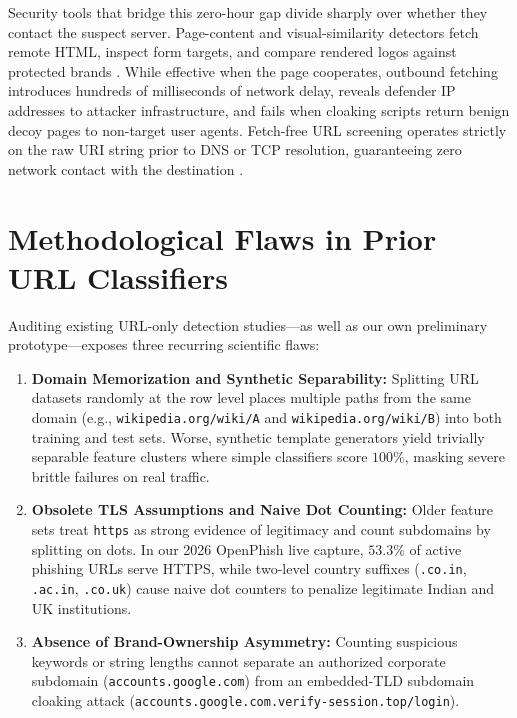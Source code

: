 \documentclass[12pt,a4paper]{report}
\begin{document}
Security tools that bridge this zero-hour gap divide sharply over whether they contact the suspect server. Page-content and visual-similarity detectors fetch remote HTML, inspect form targets, and compare rendered logos against protected brands \cite{xiang2011,abdelnabi2020}. While effective when the page cooperates, outbound fetching introduces hundreds of milliseconds of network delay, reveals defender IP addresses to attacker infrastructure, and fails when cloaking scripts return benign decoy pages to non-target user agents. Fetch-free URL screening operates strictly on the raw URI string prior to DNS or TCP resolution, guaranteeing zero network contact with the destination \cite{ma2009,sahingoz2019}.

\section[Methodological Flaws in Prior URL Classifiers]{Methodological Flaws in Prior URL Classifiers}
Auditing existing URL-only detection studies---as well as our own preliminary prototype---exposes three recurring scientific flaws:
\begin{enumerate}
\item \textbf{Domain Memorization and Synthetic Separability:} Splitting URL datasets randomly at the row level places multiple paths from the same domain (e.g., \texttt{wikipedia.org/wiki/A} and \texttt{wikipedia.org/wiki/B}) into both training and test sets. Worse, synthetic template generators yield trivially separable feature clusters where simple classifiers score $100\%$, masking severe brittle failures on real traffic.
\item \textbf{Obsolete TLS Assumptions and Naive Dot Counting:} Older feature sets treat \texttt{https} as strong evidence of legitimacy and count subdomains by splitting on dots. In our 2026 OpenPhish live capture, $53.3\%$ of active phishing URLs serve HTTPS, while two-level country suffixes (\texttt{.co.in}, \texttt{.ac.in}, \texttt{.co.uk}) cause naive dot counters to penalize legitimate Indian and UK institutions.
\item \textbf{Absence of Brand-Ownership Asymmetry:} Counting suspicious keywords or string lengths cannot separate an authorized corporate subdomain (\texttt{accounts.\allowbreak google.com}) from an embedded-TLD subdomain cloaking attack (\texttt{accounts.\allowbreak google.com.\allowbreak verify-\allowbreak session.top/\allowbreak login}).
\end{enumerate}
\end{document}
